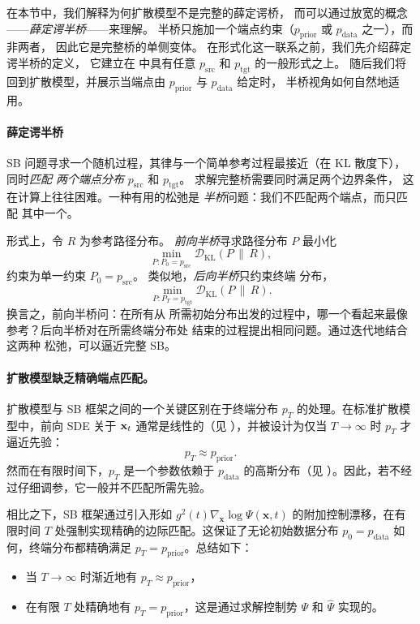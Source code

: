 在本节中，我们解释为何扩散模型不是完整的薛定谔桥，
而可以通过放宽的概念——\emph{薛定谔半桥}——来理解。
半桥只施加一个端点约束（$p_{\mathrm{prior}}$ 或 $p_{\mathrm{data}}$ 之一），而非两者，
因此它是完整桥的单侧变体。
在形式化这一联系之前，我们先介绍薛定谔半桥的定义，
它建立在  中具有任意 $p_{\mathrm{src}}$ 和 $p_{\mathrm{tgt}}$ 的一般形式之上。
随后我们将回到扩散模型，并展示当端点由 $p_{\mathrm{prior}}$ 与 $p_{\mathrm{data}}$ 给定时，
半桥视角如何自然地适用。



\paragraph{薛定谔半桥}

SB 问题寻求一个随机过程，其律与一个简单参考过程最接近（在 KL 散度下），同时\emph{匹配
两个端点分布} $p_{\mathrm{src}}$ 和 $p_{\mathrm{tgt}}$。
求解完整桥需要同时满足两个边界条件，
这在计算上往往困难。一种有用的松弛是
\emph{半桥}问题：我们不匹配两个端点，而只匹配
其中一个。

形式上，令 $R$ 为参考路径分布。
\emph{前向半桥}寻求路径分布 $P$ 最小化
\[
    \min_{P: P_0 = p_{\mathrm{src}}}
    \mathcal{D}_{\mathrm{KL}}(P \,\|\, R),
\]
约束为单一约束 $P_0 = p_{\mathrm{src}}$。
类似地，\emph{后向半桥}只约束终端
分布，
\[
    \min_{P: P_T = p_{\mathrm{tgt}}}
    \mathcal{D}_{\mathrm{KL}}(P \,\|\, R).
\]
换言之，前向半桥问：在所有从
所需初始分布出发的过程中，哪一个看起来最像
参考？后向半桥对在所需终端分布处
结束的过程提出相同问题。通过迭代地结合这两种
松弛，可以逼近完整 SB。




\paragraph{扩散模型缺乏精确端点匹配。}
扩散模型与 SB 框架之间的一个关键区别在于终端分布 $p_T$ 的处理。在标准扩散模型中，前向 SDE 关于 ${\mathbf{x}}_t$ 通常是线性的（见 ），并被设计为仅当 $T \to \infty$ 时 $p_T$ 才逼近先验：
\[
    p_T \approx p_{\mathrm{prior}}.
\]
然而在有限时间下，$p_T$ 是一个参数依赖于 $p_{\text{data}}$ 的高斯分布（见 ）。因此，若不经过仔细调参，它一般并不匹配所需先验。



相比之下，SB 框架通过引入形如 $g^2(t)\nabla_\mathbf{x}\log \Psi(\mathbf{x}, t)$ 的附加控制漂移，在有限时间 $T$ 处强制实现精确的边际匹配。这保证了无论初始数据分布 $p_0 = p_{\mathrm{data}}$ 如何，终端分布都精确满足 $p_T = p_{\mathrm{prior}}$。总结如下：
\begin{itemize}
    \item {} 当 $T \to \infty$ 时渐近地有 $p_T \approx p_{\mathrm{prior}}$，
    \item {} 在有限 $T$ 处精确地有 $p_T = p_{\mathrm{prior}}$，这是通过求解控制势 $\Psi$ 和 $\widehat{\Psi}$ 实现的。
\end{itemize}

